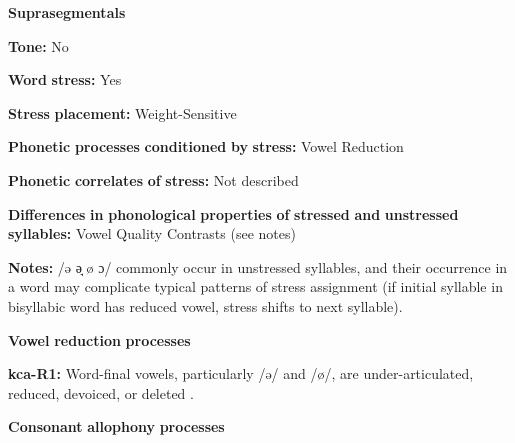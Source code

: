 \begin{styleBody}
\textbf{Suprasegmentals}
\end{styleBody}

\begin{styleBody}
\textbf{Tone:} No
\end{styleBody}

\begin{styleBody}
\textbf{Word} \textbf{stress:} Yes
\end{styleBody}

\begin{styleBody}
\textbf{Stress} \textbf{placement:} Weight-Sensitive
\end{styleBody}

\begin{styleBody}
\textbf{Phonetic} \textbf{processes} \textbf{conditioned} \textbf{by} \textbf{stress:} Vowel Reduction
\end{styleBody}

\begin{styleBody}
\textbf{Phonetic} \textbf{correlates} \textbf{of} \textbf{stress:} Not described
\end{styleBody}

\begin{styleBody}
\textbf{Differences} \textbf{in} \textbf{phonological} \textbf{properties} \textbf{of} \textbf{stressed} \textbf{and} \textbf{unstressed} \textbf{syllables:} Vowel Quality Contrasts (see notes)
\end{styleBody}

\begin{styleBody}
\textbf{Notes:} /ə ə̘ ø ɔ/ commonly occur in unstressed syllables, and their occurrence in a word may complicate typical patterns of stress assignment (if initial syllable in bisyllabic word has reduced vowel, stress shifts to next syllable).
\end{styleBody}

\begin{styleBody}
\textbf{Vowel} \textbf{reduction} \textbf{processes}
\end{styleBody}

\begin{styleBody}
\textbf{kca-R1:} Word-final vowels, particularly /ə/ and /ø/, are under-articulated, reduced, devoiced, or deleted \citep[56]{Filchenko2007}.
\end{styleBody}

\begin{styleBody}
\textbf{Consonant} \textbf{allophony} \textbf{processes}
\end{styleBody}

